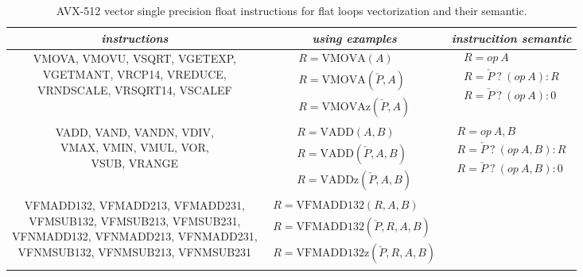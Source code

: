 \documentclass[
11pt,%
tightenlines,%
twoside,%
onecolumn,%
nofloats,%
nobibnotes,%
nofootinbib,%
superscriptaddress,%
noshowpacs,%
centertags]%
{revtex4}
\begin{document}
\begin{table}[!h]
\label{tbl:avx512semantic}
\setcaptionmargin{0mm}
\onelinecaptionsfalse
{}
\caption{AVX-512 vector single precision float instructions for flat loops vectorization and their semantic.}
\bigskip
\begin{tabular}{|c|c|c|}
\hline
\textit{instructions} & \textit{using examples} & \textit{instrucition semantic} \\
\hline
\parbox{7.5cm}{VMOVA, VMOVU, VSQRT, VGETEXP, \\ VGETMANT, VRCP14, VREDUCE, \\ VRNDSCALE, VRSQRT14, VSCALEF}
& $\begin{matrix} R = \text{VMOVA}(A) \\ R = \text{VMOVA}(\check{P}, A) \\ R = \text{VMOVAz}(\check{P}, A) \end{matrix}$
& $\begin{matrix} R = op \ A \\ R = \check{P} \ ? \ (op \ A) : R \\ R = \check{P} \ ? \ (op \ A) : 0 \end{matrix}$ \\
\hline
\parbox{7.5cm}{VADD, VAND, VANDN, VDIV, \\ VMAX, VMIN, VMUL, VOR, \\ VSUB, VRANGE}
& $\begin{matrix} R = \text{VADD}(A, B) \\ R = \text{VADD}(\check{P}, A, B) \\ R = \text{VADDz}(\check{P}, A, B) \end{matrix}$ 
& $\begin{matrix} R = op \ A, B \\ R = \check{P} \ ? \ (op \ A, B) : R \\ R = \check{P} \ ? \ (op \ A, B) : 0 \end{matrix}$ \\
\hline
\parbox{7.5cm}{VFMADD132, VFMADD213, VFMADD231, \\ VFMSUB132, VFMSUB213, VFMSUB231, \\ VFNMADD132, VFNMADD213, VFNMADD231, \\ VFNMSUB132, VFNMSUB213, VFNMSUB231}
& $\begin{matrix} R = \text{VFMADD132}(R, A, B) \\ R = \text{VFMADD132}(\check{P}, R, A, B) \\ R = \text{VFMADD132z}(\check{P}, R, A, B) \end{matrix}$

\end{tabular}
\end{table}
\end{document}
